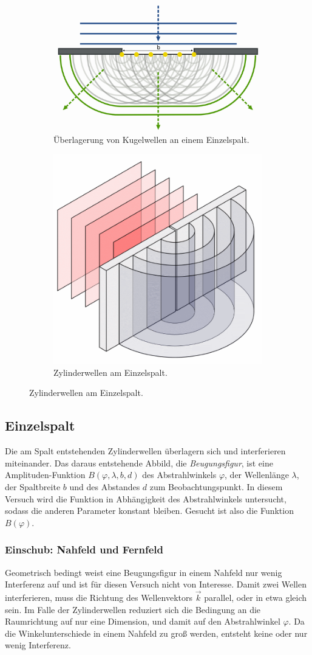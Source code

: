 \begin{figure}
    \centering
    \begin{subfigure}{.5\textwidth}
      \centering
      \includegraphics[width=.45\textwidth]{plots/Huygens.png}
    \caption{Überlagerung von Kugelwellen an einem Einzelspalt.\cite{HuygensWiki}}
    \label{fig:huygens}
    \end{subfigure}%
    \begin{subfigure}{.5\textwidth}
      \centering
      \includegraphics[width=.45\linewidth]{plots/Zylinderwellen.png}
      \caption{Zylinderwellen am Einzelspalt.\cite{BeugungWiki}}
      \label{fig:zylinder}
    \end{subfigure}
    \label{fig:huygenZylinder}
\end{figure}

\subsection{Einzelspalt}
Die am Spalt entstehenden Zylinderwellen überlagern sich und interferieren miteinander. Das daraus entstehende Abbild, die \textit{Beugungsfigur}, ist eine Amplituden-Funktion $B(\varphi, \lambda, b, d)$ des Abstrahlwinkels $\varphi$,
der Wellenlänge $\lambda$, der Spaltbreite $b$ und des Abstandes $d$ zum Beobachtungspunkt.
In diesem Versuch wird die Funktion in Abhängigkeit des Abstrahlwinkels untersucht, sodass die anderen Parameter konstant bleiben.
Gesucht ist also die Funktion $B(\varphi)$.

\subsubsection{Einschub: Nahfeld und Fernfeld}
Geometrisch bedingt weist eine Beugungsfigur in einem Nahfeld nur wenig Interferenz auf und ist für diesen Versuch nicht von Interesse.
Damit zwei Wellen interferieren, muss die Richtung des Wellenvektors $\vec{k}$ parallel, oder in etwa gleich sein. Im Falle der Zylinderwellen reduziert sich %
die Bedingung an die Raumrichtung auf nur eine Dimension, und damit auf den Abstrahlwinkel $\varphi$.
Da die Winkelunterschiede in einem Nahfeld zu groß werden, entsteht keine oder nur wenig Interferenz.

